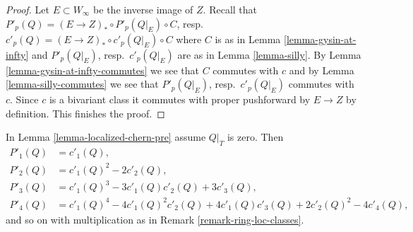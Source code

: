 \begin{proof}
Let $E \subset W_\infty$ be the inverse image of $Z$.
Recall that $P'_p(Q) = (E \to Z)_* \circ P'_p(Q|_E) \circ C$,
resp.\ $c'_p(Q) = (E \to Z)_* \circ c'_p(Q|_E) \circ C$
where $C$ is as in Lemma \ref{lemma-gysin-at-infty} and
$P'_p(Q|_E)$, resp.\ $c'_p(Q|_E)$ are as in
Lemma \ref{lemma-silly}.
By Lemma \ref{lemma-gysin-at-infty-commutes}
we see that $C$ commutes with $c$
and by Lemma \ref{lemma-silly-commutes} we see that
$P'_p(Q|_E)$, resp.\ $c'_p(Q|_E)$ commutes with $c$.
Since $c$ is a bivariant class it commutes with proper
pushforward by $E \to Z$ by definition. This finishes the proof.
\end{proof}

\begin{lemma}
\label{lemma-localized-chern-pre-compose}
In Lemma \ref{lemma-localized-chern-pre} assume $Q|_T$ is zero. Then
\begin{align*}
P'_1(Q) & = c'_1(Q), \\
P'_2(Q) & = c'_1(Q)^2 - 2c'_2(Q), \\
P'_3(Q) & = c'_1(Q)^3 - 3c'_1(Q)c'_2(Q) + 3c'_3(Q), \\
P'_4(Q) & = c'_1(Q)^4 - 4c'_1(Q)^2c'_2(Q) +
4c'_1(Q)c'_3(Q) + 2c'_2(Q)^2 - 4c'_4(Q),
\end{align*}
and so on with multiplication as in Remark \ref{remark-ring-loc-classes}.
\end{lemma}

